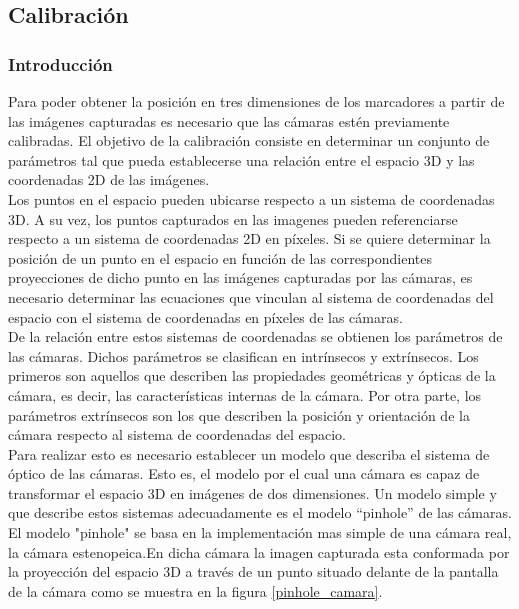 



\subsection{Calibración}
\label{calibracion}

\subsubsection{Introducción}
Para poder obtener la posición en tres dimensiones de los marcadores a partir de las imágenes capturadas es necesario que las cámaras estén previamente calibradas. El objetivo de la calibración consiste en determinar un conjunto de parámetros tal que pueda establecerse una relación entre el espacio 3D y las coordenadas 2D de las imágenes.\\

Los puntos en el espacio pueden ubicarse respecto a un sistema de coordenadas 3D. A su vez, los puntos capturados en las imagenes pueden referenciarse respecto a un sistema de coordenadas 2D en píxeles. Si se quiere determinar la posición de un punto en el espacio en función de las correspondientes proyecciones de dicho punto en las imágenes capturadas por las cámaras, es necesario determinar las ecuaciones que vinculan al sistema de coordenadas del espacio con el sistema de coordenadas en píxeles de las cámaras.\\

De la relación entre estos sistemas de coordenadas se obtienen los parámetros de las cámaras. Dichos parámetros se clasifican en intrínsecos y extrínsecos. Los primeros son aquellos que describen las propiedades geométricas y ópticas de la cámara, es decir, las características internas de la cámara. Por otra parte, los parámetros extrínsecos son los que describen la posición y orientación de la cámara respecto al sistema de coordenadas del espacio.\\

Para realizar esto es necesario establecer un modelo que describa el sistema de óptico de las cámaras. Esto es, el modelo por el cual una cámara es capaz de transformar el espacio 3D en imágenes de dos dimensiones. Un modelo simple y que describe estos sistemas adecuadamente es el modelo “pinhole” de las cámaras. 
El modelo "pinhole" se basa en la implementación mas simple de una cámara real, la cámara estenopeica.En dicha cámara la imagen capturada esta conformada por la proyección del espacio 3D a través de un punto situado delante de la pantalla de la cámara como se muestra en la figura \ref{pinhole_camara}.\\

